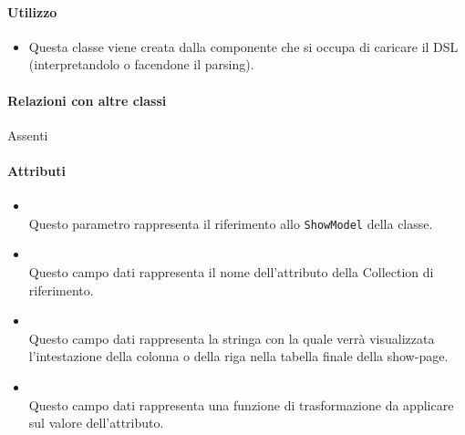 \paragraph*{Utilizzo}
\begin{itemize}
\item[] Questa classe viene creata dalla componente che si occupa di caricare il DSL (interpretandolo o facendone il parsing).
\end{itemize}

\paragraph*{Relazioni con altre classi}
Assenti

\paragraph*{Attributi}
\begin{itemize}
\item[]  \\ Questo parametro rappresenta il riferimento allo \texttt{ShowModel} della classe.
\item[]  \\ Questo campo dati rappresenta il nome dell'attributo della Collection di riferimento.
\item[]  \\ Questo campo dati rappresenta la stringa con la quale verrà visualizzata l'intestazione della colonna o della riga nella tabella finale della show-page.
\item[]  \\ Questo campo dati rappresenta una funzione di trasformazione da applicare sul valore dell'attributo.
\end{itemize}

